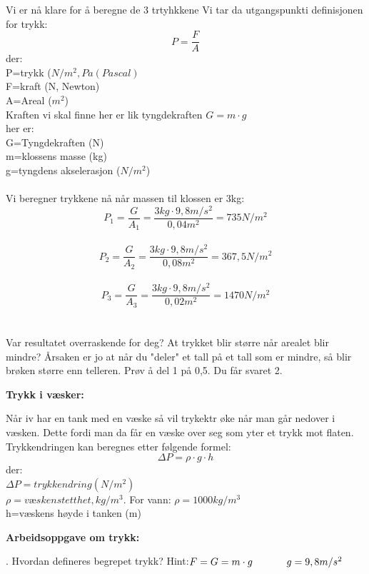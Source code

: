 \documentclass[12pt,a4paper]{article}
\begin{document}
Vi er nå klare for å beregne de 3 trtyhkkene  Vi tar da utgangspunkti definisjonen for trykk:
$$P=\frac{F}{A}$$
der:\\
P=trykk ($N/m^2, Pa (Pascal)$\\
F=kraft (N, Newton)\\
A=Areal ($m^2$)\\
\newpage
\noindent Kraften vi skal finne her  er lik tyngdekraften $G=m\cdot g$\\  
her er:\\
G=Tyngdekraften (N)\\
m=klossens masse (kg)\\
g=tyngdens akselerasjon ($N/m^2$)\\\\
\noindent Vi beregner trykkene nå når massen til klossen er 3kg:\\
$$P_1=\frac{G}{A_1}=\frac{3kg\cdot 9,8m/s^2}{0,04m^2}=735N/m^2$$\\
$$P_2=\frac{G}{A_2}=\frac{3kg\cdot 9,8m/s^2}{0,08m^2}=367,5N/m^2$$\\
$$P_3=\frac{G}{A_3}=\frac{3kg\cdot 9,8m/s^2}{0,02m^2}=1470N/m^2$$\\\\
Var resultatet overraskende for deg? At trykket blir større når arealet blir mindre? Årsaken er jo at når du "deler" et tall på et tall som er mindre, så blir brøken større enn telleren. Prøv å del 1 på 0,5.  Du får svaret 2.
\begin{center}
    \large\textbf{Trykk i væsker:}\\
\end{center}
Når iv har en tank med en væske så vil trykektr øke når man går nedover i væsken.  Dette fordi man da får en væske over seg som yter et trykk mot flaten.  Trykkendringen kan beregnes etter følgende formel:
$$\Delta P =\rho\cdot g \cdot h$$
der:\\
$\Delta P=trykkendring (N/m^2)$\\
$\rho=væskens tetthet, kg/m^3.$ For vann: $\rho=1000kg/m^3$\\
h=væskens høyde i tanken (m)
\newpage
\begin{center}
    \large\textbf{Arbeidsoppgave om trykk:}
\end{center}\vspace{1cm}

.	Hvordan defineres begrepet trykk? Hint:$F=G=m\cdot g \hspace{1.2cm} g=9,8m/s^2$\\
\end{document}
